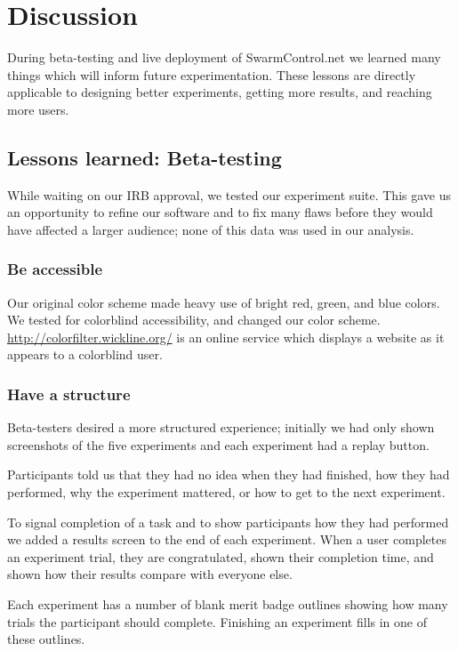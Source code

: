 \section{Discussion}\label{sec:discussion}

During beta-testing and live deployment of SwarmControl.net we learned many things which will inform future experimentation. These lessons are directly applicable to designing better experiments, getting more results, and reaching more users.

\subsection{Lessons learned: Beta-testing}

While waiting on our IRB approval, we tested our experiment suite.  This gave us an opportunity to refine our software and to fix many flaws before they would have affected a larger audience; none of this data was used in our analysis.

\subsubsection{Be accessible}

Our original color scheme made heavy use of bright red, green, and blue colors. We tested for colorblind accessibility, and changed our color scheme. \href{http://colorfilter.wickline.org/}{http://colorfilter.wickline.org/} is an online service which displays a website as it appears to a colorblind user.

\subsubsection{Have a structure}

Beta-testers desired a more structured experience; initially we had only shown screenshots of the five experiments and each experiment had a replay button.

Participants told us that they had no idea when they had finished, how they had performed, why the experiment mattered, or how to get to the next experiment.

To signal completion of a task and to show participants how they had performed we added a results screen to the end of each experiment. When a user completes an experiment trial, they are congratulated, shown their completion time, and shown how their results compare with everyone else.

Each experiment has a number of blank merit badge outlines showing how many trials the participant should complete. Finishing an experiment fills in one of these outlines.

